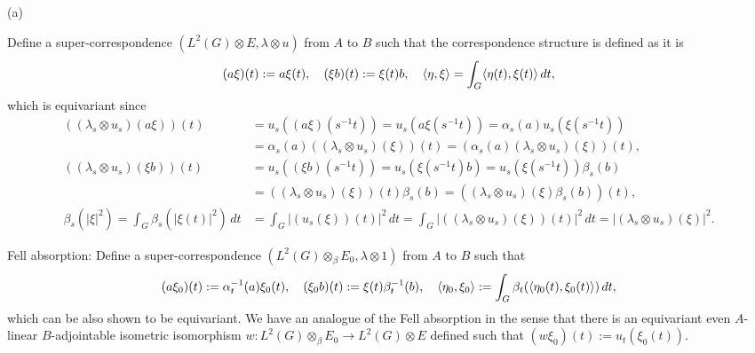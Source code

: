 \documentclass{../../large}
\begin{document}
\begin{pf}
(a)
\iffalse
(Faithfulness)
Suppose $a\xi=0$ for all $\xi\in L^2(G)\otimes E$.
Then, for $f\otimes\xi_0\in C_c(G)\otimes E$,
\[0=(a(f\otimes\xi_0))(t)=f(t)\otimes(\alpha_t^{-1}(a)\xi_0)\]
implies $f(e)\otimes(a\xi_0)=0$ by putting $t=e$, so $a\xi_0=0$ and $a=0$.

(Fullness)
Because a Hilbert module is full iff the right action is faithful, we can prove it in a similar way to faithfulness of the left action.

(Non-degeneracy)
If $e_i\in A$ is a quasi-central approximate unit such that $\alpha_t(e_i)-e_i\to0$ in $A$ compactly on $G$ (it can be shown whithout the condition that $A$ is $\sigma$-unital, Lemma 2.12 of Ozawa), then
\[(e_i\xi-\xi)(t)=(\alpha_t^{-1}(e_i)-1)\xi(t)=(\alpha_t^{-1}(e_i)-e_i)\xi(t)+(e_i-1)\xi(t)\]
\begin{align*}
|\xi-e_i\xi|^2
&=\int_G\beta_t(|((1-e_i)\xi)(t)|^2)\,dt\\
&=\int_G\beta_t(|(1-\alpha_t^{-1}(e_i))\xi(t)|^2)\,dt\\
&\le2\int_G\beta_t(|(1-e_i)\xi(t)|^2+|(e_i-\alpha_t^{-1}(e_i))\xi(t)|^2)\,dt\to0
\end{align*}
taking compact set outside which we have $\|\xi\|<\e$.
\fi


Define a super-correspondence $(L^2(G)\otimes E,\lambda\otimes u)$ from $A$ to $B$ such that the correspondence structure is defined as it is
\[(a\xi)(t):=a\xi(t),\quad(\xi b)(t):=\xi(t)b,\quad\langle\eta,\xi\rangle=\int_G\langle\eta(t),\xi(t)\rangle\,dt,\]
which is equivariant since
\begin{align*}
((\lambda_s\otimes u_s)(a\xi))(t)
&=u_s((a\xi)(s^{-1}t))
=u_s(a\xi(s^{-1}t))
=\alpha_s(a)u_s(\xi(s^{-1}t))\\
&=\alpha_s(a)((\lambda_s\otimes u_s)(\xi))(t)
=(\alpha_s(a)(\lambda_s\otimes u_s)(\xi))(t),\\
((\lambda_s\otimes u_s)(\xi b))(t)
&=u_s((\xi b)(s^{-1}t))
=u_s(\xi(s^{-1}t)b)
=u_s(\xi(s^{-1}t))\beta_s(b)\\
&=((\lambda_s\otimes u_s)(\xi))(t)\beta_s(b)
=((\lambda_s\otimes u_s)(\xi)\beta_s(b))(t),\\
\beta_s(|\xi|^2)
=\int_G\beta_s(|\xi(t)|^2)\,dt
&=\int_G|(u_s(\xi))(t)|^2\,dt
=\int_G|((\lambda_s\otimes u_s)(\xi))(t)|^2\,dt
=|(\lambda_s\otimes u_s)(\xi)|^2.
\end{align*}

Fell absorption:
Define a super-correspondence $(L^2(G)\otimes_\beta E_0,\lambda\otimes1)$ from $A$ to $B$ such that
\[(a\xi_0)(t):=\alpha_t^{-1}(a)\xi_0(t),\quad
(\xi_0b)(t):=\xi(t)\beta_t^{-1}(b),\quad
\langle\eta_0,\xi_0\rangle:=\int_G\beta_t(\langle\eta_0(t),\xi_0(t)\rangle)\,dt,\]
which can be also shown to be equivariant.
We have an analogue of the Fell absorption in the sense that there is an equivariant even $A$-linear $B$-adjointable isometric isomorphism $w:L^2(G)\otimes_\beta E_0\to L^2(G)\otimes E$ defined such that $(w\xi_0)(t):=u_t(\xi_0(t))$.


\end{pf}
\end{document}

